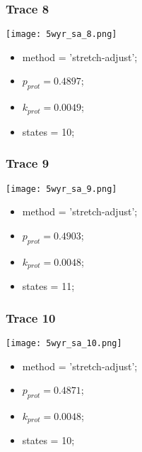 \subsubsection{Trace 8}
\begin{minipage}[c]{0.7\textwidth}
    \texttt{[image: 5wyr\_sa\_8.png]}
\end{minipage}
\hfill
\begin{minipage}[c]{0.45\textwidth}
    \begin{itemize}
        \item method = 'stretch-adjust';
        \item $p_{prot}=0.4897$;
        \item $k_{prot}=0.0049$;
        \item states = 10;
    \end{itemize}
\end{minipage}

\subsubsection{Trace 9}
\begin{minipage}[c]{0.7\textwidth}
    \texttt{[image: 5wyr\_sa\_9.png]}
\end{minipage}
\hfill
\begin{minipage}[c]{0.45\textwidth}
    \begin{itemize}
        \item method = 'stretch-adjust';
        \item $p_{prot}=0.4903$;
        \item $k_{prot}=0.0048$;
        \item states = 11;
    \end{itemize}
\end{minipage}

\subsubsection{Trace 10}
\begin{minipage}[c]{0.7\textwidth}
    \texttt{[image: 5wyr\_sa\_10.png]}
\end{minipage}
\hfill
\begin{minipage}[c]{0.45\textwidth}
    \begin{itemize}
        \item method = 'stretch-adjust';
        \item $p_{prot}=0.4871$;
        \item $k_{prot}=0.0048$;
        \item states = 10;
    \end{itemize}
\end{minipage}

